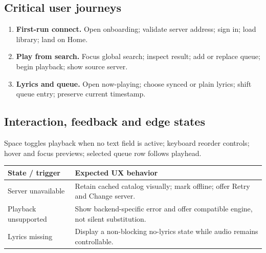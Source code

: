 \documentclass[10pt,a4paper,oneside]{report}
\begin{document}
\subsection*{Critical user journeys}
\begin{enumerate}[leftmargin=*,itemsep=3pt,topsep=2pt]
\item \textbf{First-run connect.} Open onboarding; validate server address; sign in; load library; land on Home.
\item \textbf{Play from search.} Focus global search; inspect result; add or replace queue; begin playback; show source server.
\item \textbf{Lyrics and queue.} Open now-playing; choose synced or plain lyrics; shift queue entry; preserve current timestamp.
\end{enumerate}
\subsection*{Interaction, feedback and edge states}
Space toggles playback when no text field is active; keyboard reorder controls; hover and focus previews; selected queue row follows playhead.\par
\begin{tabularx}{\linewidth}{@{}p{39mm}X@{}}\toprule State / trigger & Expected UX behavior\\\midrule
Server unavailable & Retain cached catalog visually; mark offline; offer Retry and Change server.\\
Playback unsupported & Show backend-specific error and offer compatible engine, not silent substitution.\\
Lyrics missing & Display a non-blocking no-lyrics state while audio remains controllable.\\
\bottomrule\end{tabularx}
\end{document}
